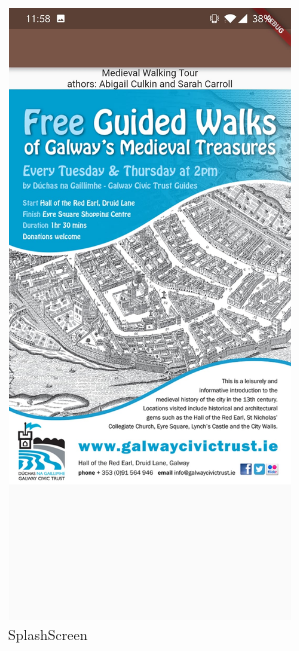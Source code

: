\begin{figure}[ht!]
    \centering
 \includegraphics[width=75mm,height=162mm]{img/splashscreen.jpg}
\caption{SplashScreen}
\label{fig:Splash screen of application}
\end{figure}

